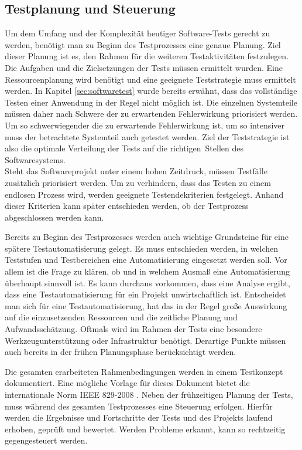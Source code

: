\subsection{Testplanung und Steuerung}
\label{subsec:testplanung_und_steuerung}
Um dem Umfang und der Komplexität heutiger Software-Tests gerecht zu werden, benötigt man zu Beginn des Testprozesses eine genaue Planung.
Ziel dieser Planung ist es, den Rahmen für die weiteren Testaktivitäten festzulegen. Die Aufgaben und die Zielsetzungen der Tests müssen ermittelt wurden. Eine Ressourcenplanung wird benötigt und eine geeignete Teststrategie muss ermittelt werden. In Kapitel \ref{sec:softwaretest} wurde bereits erwähnt, dass das vollständige Testen einer Anwendung in der Regel nicht möglich ist. Die einzelnen Systemteile müssen daher nach Schwere der zu erwartenden Fehlerwirkung priorisiert werden. Um so schwerwiegender die zu erwartende Fehlerwirkung ist, um so intensiver muss der betrachtete Systemteil auch getestet werden. Ziel der Teststrategie ist also \glqq die optimale Verteilung der Tests auf die \frqq richtigen\flqq\ Stellen des Softwaresystems.\grqq\ \cite[S.21]{spillner_basiswissen_2007} \\ Steht das Softwareprojekt unter einem hohen Zeitdruck, müssen Testfälle zusätzlich priorisiert werden.
Um zu verhindern, dass das Testen zu einem endlosen Prozess wird, werden geeignete Testendekriterien festgelegt. Anhand dieser Kriterien kann später entschieden werden, ob der Testprozess abgeschlossen werden kann.

Bereits zu Beginn des Testprozesses werden auch wichtige Grundsteine für eine spätere Testautomatisierung gelegt. Es muss entschieden werden, in welchen Teststufen und Testbereichen eine Automatisierung eingesetzt werden soll. Vor allem ist die Frage zu klären, ob und in welchem Ausmaß eine Automatisierung überhaupt sinnvoll ist. Es kann durchaus vorkommen, dass eine Analyse ergibt, dass eine Testautomatisierung für ein Projekt unwirtschaftlich ist.
Entscheidet man sich für eine Testautomatisierung, hat das in der Regel große Auswirkung auf die einzusetzenden Ressourcen und die zeitliche Planung und Aufwandsschätzung.
Oftmals wird im Rahmen der Tests eine besondere Werkzeugunterstützung oder Infrastruktur benötigt. Derartige Punkte müssen auch bereits in der frühen Planungsphase berücksichtigt werden.

Die gesamten erarbeiteten Rahmenbedingungen werden in einem Testkonzept dokumentiert.
Eine mögliche Vorlage für dieses Dokument bietet die internationale Norm IEEE 829-2008 \cite{ieee_ieee_2008}.
Neben der frühzeitigen Planung der Tests, muss während des gesamten Testprozesses eine Steuerung erfolgen.
Hierfür werden die Ergebnisse und Fortschritte der Tests und des Projekts laufend erhoben, geprüft und bewertet. Werden Probleme erkannt, kann so rechtzeitig gegengesteuert werden. 

